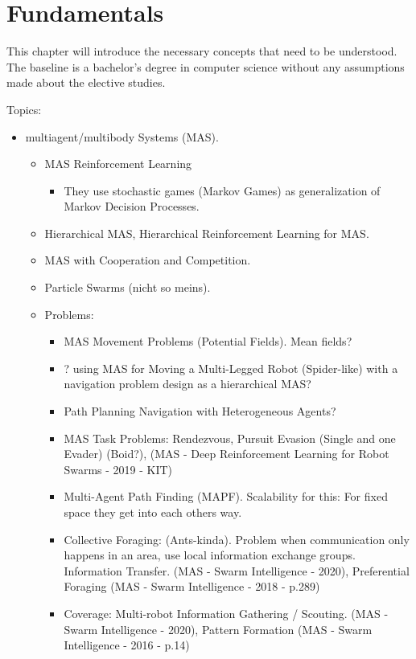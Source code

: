 
\chapter{Fundamentals}

This chapter will introduce the necessary concepts that need to be understood. The baseline is a bachelor's degree in computer science without any assumptions made about the elective studies.

Topics:
\begin{itemize}[noitemsep,nolistsep]
	\item multiagent/multibody Systems (MAS).
	\begin{itemize}[noitemsep,nolistsep]
		\item MAS Reinforcement Learning
		\begin{itemize}[noitemsep,nolistsep]
			\item They use stochastic games (Markov Games) as generalization of Markov Decision Processes.
		\end{itemize}
		\item Hierarchical MAS, Hierarchical Reinforcement Learning for MAS.
		\item MAS with Cooperation and Competition.
		\item Particle Swarms (nicht so meins).
		\item Problems:
		\begin{itemize}[noitemsep,nolistsep]
			\item MAS Movement Problems (Potential Fields). Mean fields?
			\item ? using MAS for Moving a Multi-Legged Robot (Spider-like) with a navigation problem design as a hierarchical MAS?
			\item Path Planning Navigation with Heterogeneous Agents? 
			\item MAS Task Problems: Rendezvous, Pursuit Evasion (Single and one Evader) (Boid?), (MAS - Deep Reinforcement Learning for Robot Swarms - 2019 - KIT)
			\item Multi-Agent Path Finding (MAPF). Scalability for this: For fixed space they get into each others way.
			\item Collective Foraging: (Ants-kinda). Problem when communication only happens in an area, use local information exchange groups. Information Transfer. (MAS - Swarm Intelligence - 2020), Preferential Foraging (MAS - Swarm Intelligence - 2018 - p.289)
			\item Coverage: Multi-robot Information Gathering / Scouting. (MAS - Swarm Intelligence - 2020), Pattern Formation (MAS - Swarm Intelligence - 2016 - p.14)

\end{itemize}
\end{itemize}
\end{itemize}
